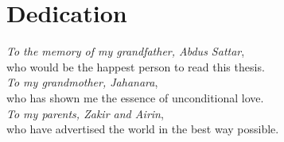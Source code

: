 \chapter{Dedication} 
\textit{To the memory of my grandfather, Abdus Sattar},\\
who would be the happest person to read this thesis.\\

\textit{To my grandmother, Jahanara},\\
who has shown me the essence of unconditional love.\\

\textit{To my parents, Zakir and Airin},\\
who have advertised the world in the best way possible.\\


